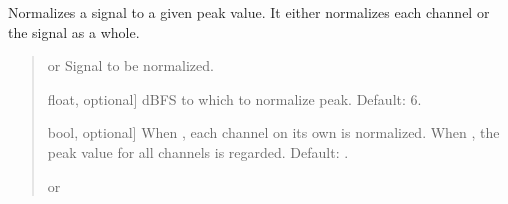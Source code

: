 \documentclass[letterpaper,10pt,english]{sphinxmanual}
\begin{document}
\begin{fulllineitems}
\label{\detokenize{modules/dsptoolbox.standard_functions:dsptoolbox.standard_functions.normalize}}
\pysigstartsignatures
{}
\pysigstopsignatures
\sphinxAtStartPar
Normalizes a signal to a given peak value. It either normalizes each
channel or the signal as a whole.
\begin{quote}\begin{description}
\begin{description}
\sphinxlineitem{\sphinxstylestrong{sig}}{[} or \sphinxtitleref{MultiBandSignal}{]}
\sphinxAtStartPar
Signal to be normalized.

\sphinxlineitem{\sphinxstylestrong{peak\_dbfs}}{[}float, optional{]}
\sphinxAtStartPar
dBFS to which to normalize peak. Default: \sphinxhyphen{}6.

\sphinxlineitem{\sphinxstylestrong{each\_channel}}{[}bool, optional{]}
\sphinxAtStartPar
When , each channel on its own is normalized. When ,
the peak value for all channels is regarded. Default: .

\end{description}

\begin{description}
\sphinxlineitem{\sphinxstylestrong{new\_sig}}{[} or \sphinxtitleref{MultiBandSignal}{]}
\end{description}

\end{description}\end{quote}

\end{fulllineitems}

\end{document}
